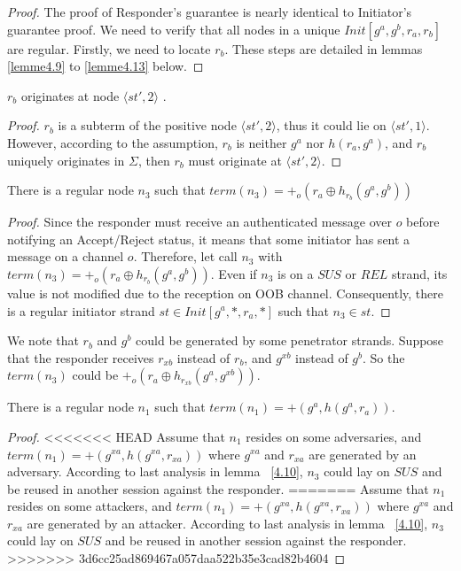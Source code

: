 \begin{itemize}
\begin{proof}
The proof of Responder's guarantee is nearly identical to Initiator's guarantee proof. We need to verify that all nodes in a unique $Init[g^a,g^b,r_a,r_b]$ are regular. Firstly, we need to locate $r_b$. These steps are detailed in lemmas \ref{lemme4.9} to \ref{lemme4.13} below.
\end{proof}

\begin{Lemma}\label{lemme4.9}
$r_b$ originates at node $\langle st',2 \rangle$ .
\end{Lemma} 

\begin{proof}
$r_b$ is a subterm of the positive node $\langle st',2 \rangle$, thus it could lie on $\langle st',1 \rangle$. However, according to the assumption, $r_b$ is neither $g^a$ nor $h(r_a,g^a)$, and $r_b$ uniquely originates in $\Sigma$, then $r_b$ must originate at $\langle st',2 \rangle$.
\end{proof}
 
\begin{Lemma}\label{4.10}
There is a regular node $n_3$ such that $term(n_3)= +_o(r_a \oplus h_{r_b}(g^a,g^b))$ 
\end{Lemma}

\begin{proof}
Since the responder must receive an authenticated message over $o$ before notifying an Accept/Reject status, it means that some initiator has sent a message on a channel $o$. Therefore, let call $n_3$ with $term(n_3)= +_o(r_a \oplus h_{r_b}(g^a,g^b))$. Even if $n_3$ is on a $SUS$ or $REL$ strand, its value is not modified due to the reception on OOB channel. Consequently, there is a regular initiator strand $st \in Init[g^a,*, r_a,*]$ such that $n_3 \in st$. 
\end{proof}

We note that $r_b$ and $g^b$ could be generated by some penetrator strands. Suppose that the responder receives $r_{xb}$ instead of $r_b$, and $g^{xb}$ instead of $g^b$. So the $term(n_3)$ could be $+_o(r_a \oplus h_{r_{xb}}(g^a,g^{xb}))$.

\begin{Lemma}\label{4.11}
There is a regular node $n_1$ such that $term(n_1)= +(g^a,h(g^a,r_a))$.
\end{Lemma}

\begin{proof}
<<<<<<< HEAD
Assume that $n_1$ resides on some adversaries, and $term(n_1) = +(g^{xa},h(g^{xa},r_{xa}))$ where $g^{xa}$ and $r_{xa}$ are generated by an adversary. According to last analysis in lemma ~\ref{4.10}, $n_3$ could lay on $SUS$ and be reused in another session against the responder. 
=======
Assume that $n_1$ resides on some attackers, and $term(n_1) = +(g^{xa},h(g^{xa},r_{xa}))$ where $g^{xa}$ and $r_{xa}$ are generated by an attacker. According to last analysis in lemma ~\ref{4.10}, $n_3$ could lay on $SUS$ and be reused in another session against the responder. 
>>>>>>> 3d6cc25ad869467a057daa522b35e3cad82b4604


\end{proof}
\end{itemize}
